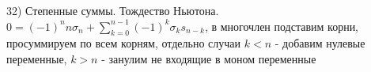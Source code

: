 32) Степенные суммы. Тождество Ньютона.\\
$0=(-1)^n n\sigma_n + \sum_{k=0}^{n-1}(-1)^k \sigma_k s_{n-k}$, в многочлен подставим корни, просуммируем по всем корням, отдельно случаи $k < n$ - добавим нулевые переменные, $k > n$ - занулим не входящие в моном переменные\\
\\
